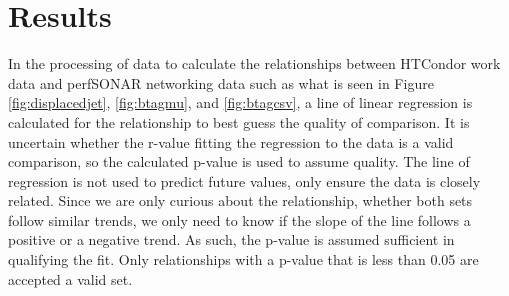 \documentclass[print,ms]{nuthesis}
\begin{document}
\chapter{Results}
\label{sec:Evaluation}
In the processing of data to calculate the relationships between HTCondor work data and perfSONAR networking data such as what is seen in Figure \ref{fig:displacedjet}, \ref{fig:btagmu}, and \ref{fig:btagcsv}, a line of linear regression is calculated for the relationship to best guess the quality of comparison. It is uncertain whether the r-value fitting the regression to the data is a valid comparison, so the calculated p-value is used to assume quality. The line of regression is not used to predict future values, only ensure the data is closely related. Since we are only curious about the relationship, whether both sets follow similar trends, we only need to know if the slope of the line follows a positive or a negative trend. As such, the p-value is assumed sufficient in qualifying the fit. Only relationships with a p-value that is less than 0.05 are accepted a valid set.
\end{document}
